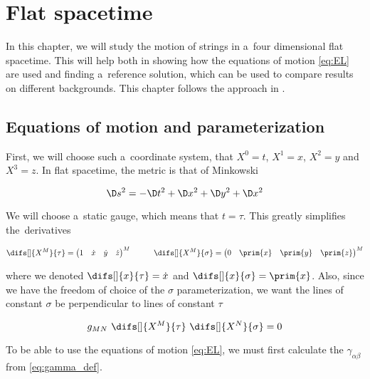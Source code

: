 \chapter{Flat spacetime}

In this chapter, we will study the motion of strings in a~four dimensional flat spacetime. This will help both in showing how the equations of motion \eqref{eq:EL} are used and finding a~reference solution, which can be used to compare results on different backgrounds. This chapter follows the approach in \cite{zwiebach}.


\section{Equations of motion and parameterization}

First, we will choose such a~coordinate system, that $X^{0} = t$, $X^{1} = x$, $X^{2} = y$ and $X^{3} = z$. In flat spacetime, the metric is that of Minkowski

\begin{equation}
    \label{eq:minkowski}
	\D s^2 = -\D t^2 + \D x^2 + \D y^2 + \D x^2
\end{equation}

\noindent
We will choose a~static gauge, which means that $t = \tau$.
This greatly simplifies the~derivatives 

\begin{equation}
        \difs[] {X^M} {\tau} = \begin{pmatrix} 1 & \dot{x} & \dot{y} & \dot{z} \end{pmatrix}^M \hspace{1cm}
        \difs[] {X^M} {\sigma} = \begin{pmatrix} 0 & \prim{x} & \prim{y} & \prim{z} \end{pmatrix}^M
\end{equation}

\noindent
where we denoted $\difs[] {x} {\tau} = \dot{x}$ and $\difs[] {x} {\sigma} = \prim{x}$.
Also, since we have the freedom of choice of the $\sigma$ parameterization, we want the lines of constant $\sigma$ be perpendicular to lines of constant $\tau$

\begin{equation}
\label{eq:param_condition1_flat}
    g_{M N} ~ \difs[] {X^M} {\tau} ~ \difs[] {X^N} {\sigma} = 0
\end{equation}

\noindent
To be able to use the equations of motion \eqref{eq:EL}, we must first calculate the $\gamma_{\alpha \beta}$ from \cref{eq:gamma_def}.


